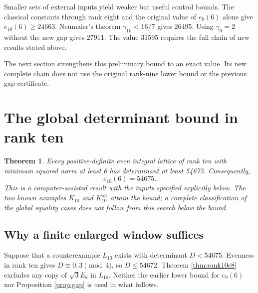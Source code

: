 \documentclass[11pt,a4paper]{article}
\newtheorem{theorem}{Theorem}[section]
\theoremstyle{remark}\newtheorem{remark}[theorem]{Remark}
\newcommand{\Kalt}{K_{10}^{\mathrm{alt}}}
\begin{document}
Smaller sets of external inputs yield weaker but useful control bounds. The classical constants through rank eight and the original value of $e_9(6)$ alone give $e_{10}(6)\ge24663$. Neumaier's theorem $\gamma_{10}<16/7$ \cite{neumaier} gives 26495. Using $\gamma_9=2$ without the new gap gives 27911. The value 31595 requires the full chain of new results stated above.

The next section strengthens this preliminary bound to an exact value. Its new complete chain does not use the original rank-nine lower bound or the previous gap certificate.

\section{The global determinant bound in rank ten}\label{sec:global10exact}

\begin{theorem}\label{thm:e10exact}
Every positive-definite even integral lattice of rank ten with minimum squared norm at least 6 has determinant at least 54675. Consequently,
\[
\boxed{e_{10}(6)=54675}.
\]
This is a computer-assisted result with the inputs specified explicitly below. The two known examples $K_{10}$ and $\Kalt$ attain the bound; a complete classification of the \emph{global} equality cases does not follow from this search below the bound.
\end{theorem}

\subsection{Why a finite enlarged window suffices}

Suppose that a counterexample $L_{10}$ exists with determinant $D<54675$. Evenness in rank ten gives $D\equiv0,3\pmod4$, so $D\le54672$. Theorem \ref{thm:rank10e8} excludes any copy of $\sqrt3E_8$ in $L_{10}$. Neither the earlier lower bound for $e_9(6)$ nor Proposition \ref{prop:gap} is used in what follows.
\end{document}
